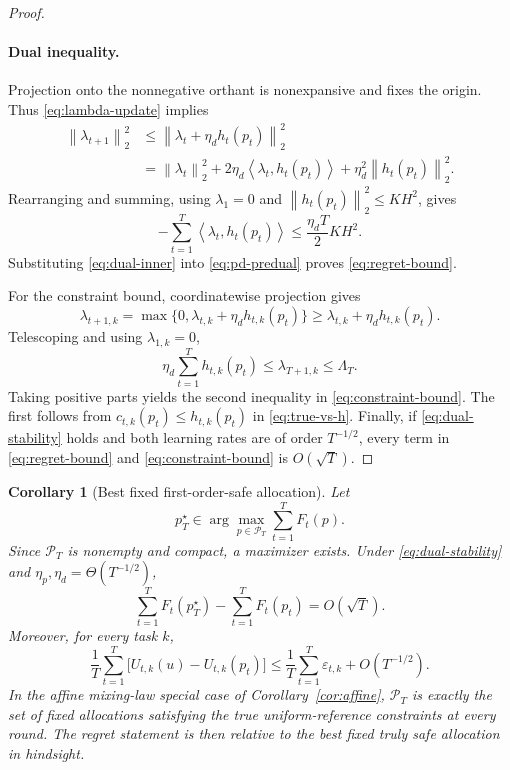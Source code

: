 \documentclass[11pt]{article}
\newtheorem{corollary}{Corollary}
\newcommand{\ip}[2]{\left\langle #1,#2\right\rangle}
\newcommand{\norm}[1]{\left\lVert #1\right\rVert}
\begin{document}
\begin{proof}
\paragraph{Dual inequality.}
Projection onto the nonnegative orthant is nonexpansive and fixes the origin. Thus \eqref{eq:lambda-update} implies
\begin{align}
    \norm{\lambda_{t+1}}_2^2
    &\le
    \norm{\lambda_t+\eta_d h_t(p_t)}_2^2\\
    &=
    \norm{\lambda_t}_2^2
    +2\eta_d\ip{\lambda_t}{h_t(p_t)}
    +\eta_d^2\norm{h_t(p_t)}_2^2.
    \label{eq:dual-square}
\end{align}
Rearranging and summing, using $\lambda_1=0$ and $\norm{h_t(p_t)}_2^2\le KH^2$, gives
\begin{equation}
    -\sum_{t=1}^T\ip{\lambda_t}{h_t(p_t)}
    \le
    \frac{\eta_d T}{2}KH^2.
    \label{eq:dual-inner}
\end{equation}
Substituting \eqref{eq:dual-inner} into \eqref{eq:pd-predual} proves \eqref{eq:regret-bound}.

For the constraint bound, coordinatewise projection gives
\[
    \lambda_{t+1,k}
    =\max\{0,\lambda_{t,k}+\eta_dh_{t,k}(p_t)\}
    \ge
    \lambda_{t,k}+\eta_dh_{t,k}(p_t).
\]
Telescoping and using $\lambda_{1,k}=0$,
\[
    \eta_d\sum_{t=1}^T h_{t,k}(p_t)
    \le
    \lambda_{T+1,k}
    \le
    \Lambda_T.
\]
Taking positive parts yields the second inequality in \eqref{eq:constraint-bound}. The first follows from $c_{t,k}(p_t)\le h_{t,k}(p_t)$ in \eqref{eq:true-vs-h}. Finally, if \eqref{eq:dual-stability} holds and both learning rates are of order $T^{-1/2}$, every term in \eqref{eq:regret-bound} and \eqref{eq:constraint-bound} is $O(\sqrt T)$.
\end{proof}

\begin{corollary}[Best fixed first-order-safe allocation]
\label{cor:best-fixed}
Let
\[
    p_T^\star\in
    \arg\max_{p\in\mathcal P_T}\sum_{t=1}^TF_t(p).
\]
Since $\mathcal P_T$ is nonempty and compact, a maximizer exists. Under \eqref{eq:dual-stability} and $\eta_p,\eta_d=\Theta(T^{-1/2})$,
\[
    \sum_{t=1}^T F_t(p_T^\star)
    -\sum_{t=1}^T F_t(p_t)
    =O(\sqrt T).
\]
Moreover, for every task $k$,
\begin{equation}
    \frac1T\sum_{t=1}^T
    \bigl[U_{t,k}(u)-U_{t,k}(p_t)\bigr]
    \le
    \frac1T\sum_{t=1}^T\varepsilon_{t,k}
    +O(T^{-1/2}).
    \label{eq:avg-lag}
\end{equation}
In the affine mixing-law special case of Corollary~\ref{cor:affine}, $\mathcal P_T$ is exactly the set of fixed allocations satisfying the true uniform-reference constraints at every round. The regret statement is then relative to the best fixed truly safe allocation in hindsight.
\end{corollary}
\end{document}
